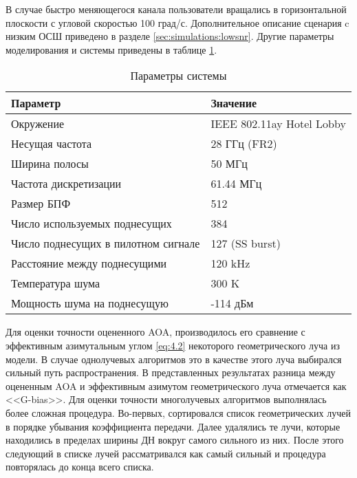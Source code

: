  В случае быстро меняющегося канала пользователи вращались в горизонтальной
плоскости с угловой скоростью 100 град/с. Дополнительное описание 
сценария c низким ОСШ приведено в разделе \ref{sec:simulations:lowsnr}.  
Другие параметры моделирования и системы приведены в таблице \ref{tab:4.10}.

\begin{table}
    \centering
    \caption{Параметры системы}
    \label{tab:4.10}
    \begin{tabular}{|l|l|}
        \hline
        \textbf{Параметр} & \textbf{Значение} \\ 
        \hline
        Окружение & IEEE 802.11ay Hotel Lobby \\
        \hline
        Несущая частота & 28 ГГц (FR2) \\ 
        \hline
        Ширина полосы & 50 МГц \\ 
        \hline
        Частота дискретизации & 61.44 МГц \\ 
        \hline
        Размер БПФ & 512 \\ 
        \hline
        Число используемых поднесущих & 384 \\
        \hline
        Число поднесущих в пилотном сигнале & 127 (SS burst)\\
        \hline
        Расстояние между поднесущими & 120 kHz \\ 
        \hline
        Температура шума & 300 K \\
        \hline
        Мощность шума на поднесущую & -114 дБм \\
        \hline
    \end{tabular}
\end{table}

Для оценки точности оцененного AOA, производилось его сравнение  с эффективным азимутальным углом
\eqref{eq:4.2} некоторого геометрического луча из модели. 
В случае однолучевых алгоритмов  это в качестве этого луча выбирался сильный
путь распространения. В представленных результатах разница между оцененным AOA и эффективным азимутом
геометрического луча отмечается как <<G-bias>>.
Для оценки точности многолучевых алгоритмов  выполнялась более сложная процедура. 
Во-первых, сортировался список геометрических лучей в порядке убывания коэффициента передачи. 
Далее удалялись те лучи, которые находились в пределах ширины ДН вокруг самого сильного из них.
После этого следующий в списке лучей рассматривался как самый сильный и процедура повторялась до 
конца всего списка.

